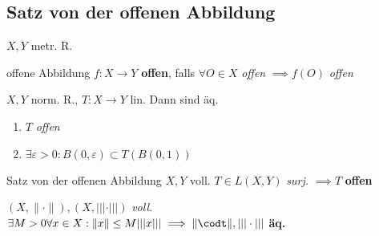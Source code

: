 \subsection{Satz von der offenen Abbildung}
$X,Y$ metr. R.

\begin{definition}{offene Abbildung}
  $f:X\to Y$ \textbf{offen}, falls $\forall O \in X$ \textit{offen}
  $\implies f(O)$ \textit{offen}
\end{definition}

\begin{lemma}
  $X,Y$ norm. R., $T:X \to Y$ lin. Dann sind äq.
  \begin{enumerate}[label = (\roman*)]
    \item $T$ \textit{offen}
    \item $\exists \varepsilon > 0 : B(0,\varepsilon) \subset T(B(0,1))$
  \end{enumerate}
\end{lemma}

\begin{satz}{Satz von der offenen Abbildung}
  $X,Y$ voll. $T \in L(X,Y)$ \textit{surj.} $\implies T$ \textbf{offen}
\end{satz}

\begin{korrolar}
  $(X,\|\cdot\|),(X,|||\cdot|||)$ \textit{voll.}
  $\exists M > 0 \forall x\in X: \|x\| \leq M |||x|||
  \implies \|\codt\|,|||\cdot|||$ \textbf{äq.}
\end{korrolar}
